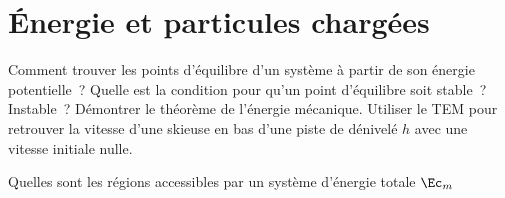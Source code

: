\documentclass[a4paper, 10pt, final, garamond]{book}
\begin{document}
\setcounter{chapter}{16}

\chapter{Énergie et particules chargées}

\begin{enumerate}[label=\sqenumi]
	Comment trouver les points d'équilibre d'un système à partir de son énergie
	potentielle~? Quelle est la condition pour qu'un point d'équilibre soit
	stable~? Instable~?
	\smallbreak
	\psw{
		\[
			\text{Équilibre} \Lra
			\eval{\pdv{\Ec_p}{x}}_{x\ind{eq}} \stm{=} 0
			\qet \text{stable si} \eval{\pdv[2]{\Ec_p}{x}}_{x\ind{eq}} \stm{>} 0
			\quad ; \quad
			\text{instable si} \eval{\pdv[2]{\Ec_p}{x}}_{x\ind{eq}} < 0
		\]
	}
	Démontrer le théorème de l'énergie mécanique. Utiliser le TEM pour retrouver
	la vitesse d'une skieuse en bas d'une piste de dénivelé $h$ avec une vitesse
	initiale nulle.
	\smallbreak
	\begin{isd}
		\vspace{-15pt}
		\tcblower
		\vspace{-15pt}
	\end{isd}
	Quelles sont les régions accessibles par un système d'énergie totale $\Ec_m$

\end{enumerate}
\end{document}
